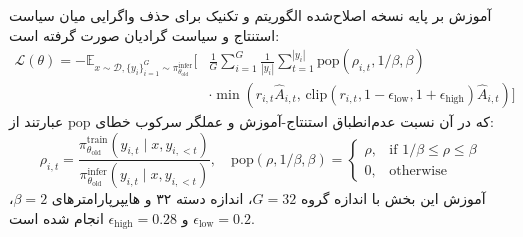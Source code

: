 آموزش بر پایه نسخه اصلاح‌شده الگوریتم  \cite{shao2024deepseekmath} و تکنیک  \cite{zhao2025icepop} برای حذف واگرایی میان سیاست استنتاج و سیاست گرادیان صورت گرفته است:
\begin{equation}
\begin{aligned}
    \mathcal{L}(\theta) = -\mathbb{E}_{x \sim \mathcal{D}, \{y_i\}_{i=1}^G \sim \pi_{\theta_{\text{old}}}^{\text{infer}}} \Bigg[ & \frac{1}{G} \sum_{i=1}^G \frac{1}{|y_i|} \sum_{t=1}^{|y_i|} \text{pop}(\rho_{i,t}, 1/\beta, \beta) \\
    & \cdot \min \left( r_{i,t}\hat{A}_{i,t}, \, \text{clip}(r_{i,t}, 1-\epsilon_{\text{low}}, 1+\epsilon_{\text{high}})\hat{A}_{i,t} \right) \Bigg]
\end{aligned}
\end{equation}
که در آن نسبت عدم‌انطباق استنتاج-آموزش و عملگر سرکوب خطای $\text{pop}$ عبارتند از:
\begin{equation}
    \rho_{i,t} = \frac{\pi_{\theta_{\text{old}}}^{\text{train}}(y_{i,t} \mid x, y_{i,<t})}{\pi_{\theta_{\text{old}}}^{\text{infer}}(y_{i,t} \mid x, y_{i,<t})}, \quad
    \text{pop}(\rho, 1/\beta, \beta) = \begin{cases} \rho, & \text{if } 1/\beta \le \rho \le \beta \\ 0, & \text{otherwise} \end{cases}
\end{equation}
آموزش این بخش با اندازه گروه $G=32$، اندازه دسته ۳۲ و هایپرپارامترهای $\beta=2$، $\epsilon_{\text{low}}=0.2$ و $\epsilon_{\text{high}}=0.28$ انجام شده است.


